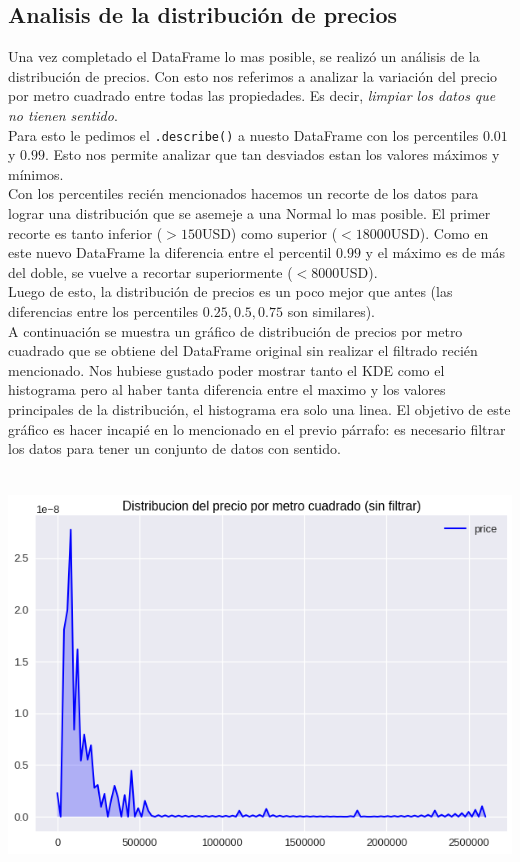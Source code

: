 \documentclass[a4paper, 10pt]{article}
\def\code#1{\texttt{#1}}
\newcommand\tab[1][0.5cm]{\hspace*{#1}}
\begin{document}
			\subsection{Analisis de la distribución de precios}
				Una vez completado el DataFrame lo mas posible, se realizó un análisis de la distribución de precios.
				Con esto nos referimos a analizar la variación del precio por metro cuadrado entre todas las
				propiedades. Es decir, \emph{limpiar los datos que no tienen sentido}. \\
				\tab Para esto le pedimos el \code{.describe()} a nuesto DataFrame con los percentiles $0.01$ y
				$0.99$. Esto nos permite analizar que tan desviados estan los valores máximos y mínimos. \\
				\tab Con los percentiles recién mencionados hacemos un recorte de los datos para lograr una distribución
				que se asemeje a una Normal lo mas posible. El primer recorte es tanto inferior ($ > 150$USD) como superior
				($<18000$USD). Como en este nuevo DataFrame la diferencia entre el percentil $0.99$ y el máximo es de más
				del doble, se vuelve a recortar superiormente ($<8000$USD). \\
				\tab Luego de esto, la distribución de precios es un poco mejor que antes (las diferencias entre los
				percentiles $0.25, 0.5, 0.75$ son similares). \\
				\tab A continuación se muestra un gráfico de distribución de precios por metro cuadrado que se obtiene
				del DataFrame original sin realizar el filtrado recién mencionado. Nos hubiese gustado poder mostrar tanto
				el KDE como el histograma pero al haber tanta diferencia entre el maximo y los valores principales de la
				distribución, el histograma era solo una linea. El objetivo de este gráfico es hacer incapié en lo mencionado
				en el previo párrafo: es necesario filtrar los datos para tener un conjunto de datos con sentido.
				\begin{center}
       				\includegraphics[width=6in, height=4.2in]{images/m2UnfilteredKDE}
		   		\end{center}
\end{document}
